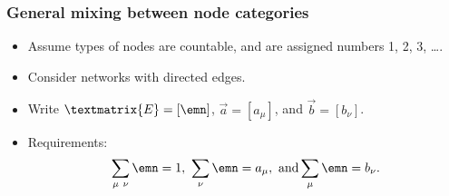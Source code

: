 \begin{frame}
  \frametitle{General mixing between node categories}

  \begin{itemize}
  \item<2->
    Assume types of nodes are countable, and are
    assigned numbers 1, 2, 3, \ldots.
  \item<3->
    Consider networks with directed edges.
  \item<7->
    Write $\textmatrix{E} = [\emn]$, $\vec{a} = [a_\mu]$, and $\vec{b} = [b_\nu]$.
  \item<8->
    Requirements:
    $$
    \sum_{\mu\ \nu} \emn = 1,
    \
    \sum_{\nu} \emn = a_{\mu},
    \
    \mbox{and}
    \sum_{\mu} \emn = b_{\nu}.
    $$
  \end{itemize}

\end{frame}


